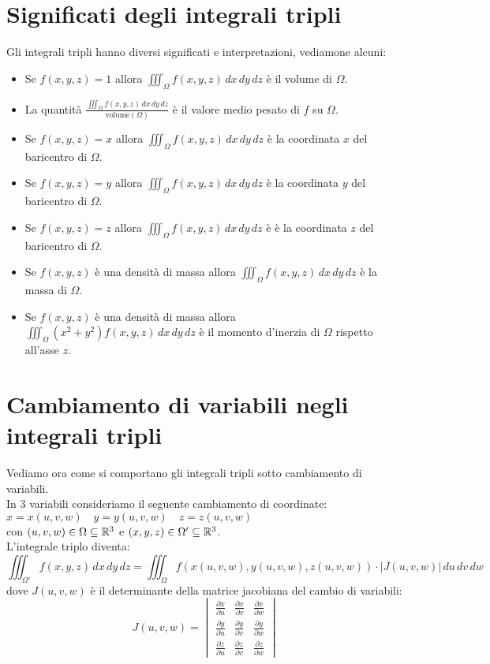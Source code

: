 \section{Significati degli integrali tripli}
Gli integrali tripli hanno diversi significati e interpretazioni, vediamone alcuni:
\begin{itemize}
  \item Se $f(x,y,z)=1$ allora $\iiint_{\Omega} f(x,y,z) \, dx \, dy \, dz$ è il volume di $\Omega$.
  \item La quantità $\frac{\iiint_{\Omega} f(x,y,z) \, dx \, dy \, dz}{\text{volume}(\Omega)}$ è il valore medio pesato di $f$ su $\Omega$.
  \item Se $f(x,y,z)=x$ allora $\iiint_{\Omega} f(x,y,z) \, dx \, dy \, dz$ è la coordinata $x$ del baricentro di $\Omega$.
  \item Se $f(x,y,z)=y$ allora $\iiint_{\Omega} f(x,y,z) \, dx \, dy \, dz$ è la coordinata $y$ del baricentro di $\Omega$.
  \item Se $f(x,y,z)=z$ allora $\iiint_{\Omega} f(x,y,z) \, dx \, dy \, dz$ è è la coordinata $z$ del baricentro di $\Omega$.
  \item Se $f(x,y,z)$ è una densità di massa allora $\iiint_{\Omega} f(x,y,z) \, dx \, dy \, dz$ è la massa di $\Omega$.
  \item Se $f(x,y,z)$ è una densità di massa allora $\iiint_{\Omega} (x^2 + y^2) f(x,y,z) \, dx \, dy \, dz$ è il momento d'inerzia di $\Omega$ rispetto all'asse $z$.
\end{itemize}


\section{Cambiamento di variabili negli integrali tripli}
Vediamo ora come si comportano gli integrali tripli sotto cambiamento di variabili.\\
In 3 variabili consideriamo il seguente cambiamento di coordinate:\\
$
  x = x(u,v,w) \quad y = y(u,v,w)  \quad z = z(u,v,w)
$\\
con $(u,v,w) \in \Omega \subseteq \mathbb{R}^3$ e $(x,y,z) \in \Omega' \subseteq \mathbb{R}^3$.\\
L'integrale triplo diventa:
\[
\iiint_{\Omega'} f(x,y,z) \, dx \, dy \, dz = \iiint_{\Omega} f(x(u,v,w),y(u,v,w),z(u,v,w)) \cdot |J(u,v,w)| \, du \, dv \, dw
\]
dove $J(u,v,w)$ è il determinante della matrice jacobiana del cambio di variabili:
\[
J(u,v,w) = \begin{vmatrix}
  \frac{\partial x}{\partial u} & \frac{\partial x}{\partial v} & \frac{\partial x}{\partial w}\\
  \frac{\partial y}{\partial u} & \frac{\partial y}{\partial v} & \frac{\partial y}{\partial w}\\
  \frac{\partial z}{\partial u} & \frac{\partial z}{\partial v} & \frac{\partial z}{\partial w}
\end{vmatrix}
\]

